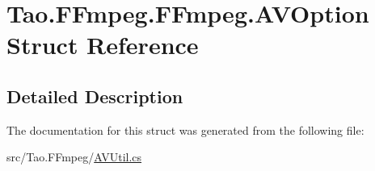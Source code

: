 \hypertarget{struct_tao_1_1_f_fmpeg_1_1_f_fmpeg_1_1_a_v_option}{
\section{Tao.FFmpeg.FFmpeg.AVOption Struct Reference}
\label{struct_tao_1_1_f_fmpeg_1_1_f_fmpeg_1_1_a_v_option}
}


\subsection{Detailed Description}


The documentation for this struct was generated from the following file:\begin{DoxyCompactItemize}
\item 
src/Tao.FFmpeg/\hyperlink{_a_v_util_8cs}{AVUtil.cs}\end{DoxyCompactItemize}
